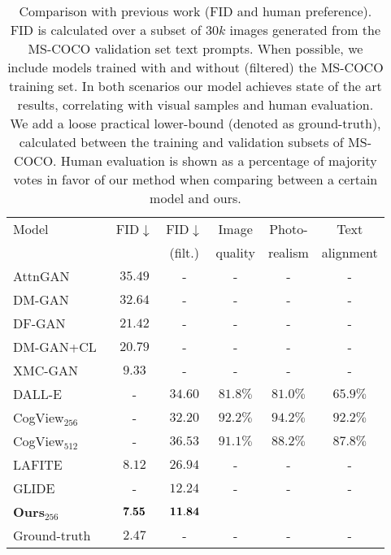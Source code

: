 \documentclass[final]{cvpr}
\begin{document}
\setlength{\tabcolsep}{1.5pt}
\begin{table}
\begin{center}
\label{table:prev_work}
\begin{tabular}{l|cc|ccc}
\hline\noalign{\smallskip}
Model & FID$\downarrow$ & FID$\downarrow$ & Image & Photo- & Text \\
& & (filt.) & quality & realism & alignment  \\
\noalign{\smallskip}
\hline
\noalign{\smallskip}
AttnGAN~\cite{xu2018attngan}  & $35.49$ & - & - & - & - \\
DM-GAN~\cite{zhu2019dm} & $32.64$ & - & - & - & - \\
DF-GAN~\cite{tao2020df} & $21.42$ & - & - & - & - \\
DM-GAN+CL~\cite{ye2021improving} & $20.79$ & - & - & - & -\\
XMC-GAN~\cite{zhang2021cross} & $9.33$ & - & - & - & -\\
DALL-E~\cite{ramesh2021zero} & - & $34.60$ & $81.8\%$ & $81.0\%$ & $65.9\%$ \\
CogView$_{256}$~\cite{ding2021cogview} & - & $32.20$  & $92.2\%$ & $94.2\%$ & $92.2\%$\\
CogView$_{512}$~\cite{ding2021cogview} & - & $36.53$ & $91.1\%$  & $88.2\%$ & $87.8\%$ \\
LAFITE~\cite{zhou2021lafite} & $8.12$ & $26.94$ & - & - & - \\
GLIDE~\cite{nichol2021glide} & - & $12.24$ & - &  - & - \\
\bf{Ours}$_{256}$ & {$\bf{7.55}$} & $\bf{11.84}$ \\
\hline
Ground-truth & $2.47$ & - & - & - & - \\
\hline
\end{tabular}
\vspace{0.2cm}
\caption{Comparison with previous work (FID and human preference). FID is calculated over a subset of $30k$ images generated from the MS-COCO validation set text prompts. When possible, we include models trained with and without (filtered) the MS-COCO training set. In both scenarios our model achieves state of the art results, correlating with visual samples and human evaluation. We add a loose practical lower-bound (denoted as ground-truth), calculated between the training and validation subsets of MS-COCO. Human evaluation is shown as a percentage of majority votes in favor of our method when comparing between a certain model and ours.}
\end{center}
\end{table}
\setlength{\tabcolsep}{1.4pt}
\end{document}
